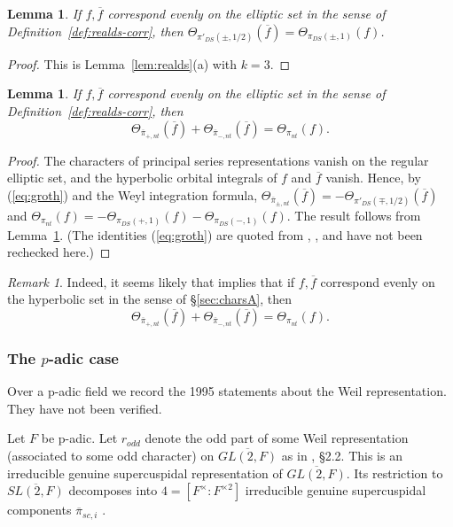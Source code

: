 \documentclass[12pt,letterpaper]{book}
\theoremstyle{plain}
\newtheorem{lemma}[theorem]{Lemma}
\theoremstyle{definition}
\theoremstyle{remark}
\newtheorem{remark}[theorem]{Remark}
\theoremstyle{remark}
\begin{document}
\begin{lemma}\label{lem:ds-3/2} If
$f,\overline{f}$ correspond evenly on the elliptic set in
the sense of Definition~\ref{def:realds-corr}, then
$\Theta_{\pi'_{DS}(\pm,1/2)}(\overline{f})
=\Theta_{\pi_{DS}(\pm,1)}(f)$.
\end{lemma}

\begin{proof}
This is Lemma~\ref{lem:realds}(a) with $k=3$.
\end{proof}

\begin{lemma} If $f,\overline{f}$ correspond evenly on the elliptic set
in the sense of Definition~\ref{def:realds-corr}, then
\[
\Theta_{\overline{\pi}_{+,nt}}(\overline{f})
+\Theta_{\overline{\pi}_{-,nt}}(\overline{f})
=\Theta_{\pi_{nt}}(f).
\]
\end{lemma}

\begin{proof}
The characters of principal series representations
vanish on the regular elliptic set, and the hyperbolic orbital
integrals of $f$ and $\overline f$ vanish. Hence, by (\ref{eq:groth}) and
the Weyl integration formula,
$\Theta_{\overline{\pi}_{\pm,nt}}(\overline f)=-\Theta_{\pi'_{DS}(\mp,1/2)}(\overline f)$
and
$\Theta_{\pi_{nt}}(f)=-\Theta_{\pi_{DS}(+,1)}(f)-\Theta_{\pi_{DS}(-,1)}(f)$.
The result follows from Lemma~\ref{lem:ds-3/2}. (The identities
(\ref{eq:groth}) are quoted from \cite{Ad1}, \cite{Ge2}, and have not
been rechecked here.)
\end{proof}

\begin{remark}
Indeed, it seems likely that \cite{Fl} implies that
if $f,\overline{f}$ correspond evenly on the hyperbolic set in
the sense of \S\ref{sec:charsA}, then
\[
\Theta_{\overline{\pi}_{+,nt}}(\overline{f})
+\Theta_{\overline{\pi}_{-,nt}}(\overline{f})
=\Theta_{\pi_{nt}}(f).
\]
\end{remark}

\subsubsection{The \texorpdfstring{$p$}{p}-adic case}

Over a p-adic field we record the 1995 statements about the Weil representation. They have not been verified.


Let $F$ be p-adic. Let $r_{odd}$ denote the odd part of some Weil
representation (associated to some odd character)
on $\overline{GL(2,F)}$ as in \cite{Fl}, \S 2.2. This is an
irreducible genuine supercuspidal representation of
$\overline{GL(2,F)}$. Its restriction to
$\overline{SL(2,F)}$ decomposes into $4=[F^\times:F^{\times 2}]$
irreducible genuine supercuspidal components $\overline{\pi}_{sc,i}$
\cite{M3}.
\end{document}
